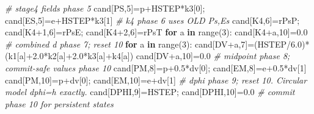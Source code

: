 \documentclass[
  a4paper,
]{article}
\newenvironment{Shaded}{}{}
\newcommand{\BuiltInTok}[1]{\textcolor[rgb]{0.00,0.50,0.00}{#1}}
\newcommand{\CommentTok}[1]{\textcolor[rgb]{0.38,0.63,0.69}{\textit{#1}}}
\newcommand{\ControlFlowTok}[1]{\textcolor[rgb]{0.00,0.44,0.13}{\textbf{#1}}}
\newcommand{\DecValTok}[1]{\textcolor[rgb]{0.25,0.63,0.44}{#1}}
\newcommand{\FloatTok}[1]{\textcolor[rgb]{0.25,0.63,0.44}{#1}}
\newcommand{\KeywordTok}[1]{\textcolor[rgb]{0.00,0.44,0.13}{\textbf{#1}}}
\newcommand{\NormalTok}[1]{#1}
\newcommand{\OperatorTok}[1]{\textcolor[rgb]{0.40,0.40,0.40}{#1}}
\begin{document}
\begin{Shaded}
\begin{Highlighting}[]
    \CommentTok{\# stage4 fields phase 5}
\NormalTok{    cand[PS,}\DecValTok{5}\NormalTok{]}\OperatorTok{=}\NormalTok{p}\OperatorTok{+}\NormalTok{HSTEP}\OperatorTok{*}\NormalTok{k3[}\DecValTok{0}\NormalTok{]}\OperatorTok{;}\NormalTok{ cand[ES,}\DecValTok{5}\NormalTok{]}\OperatorTok{=}\NormalTok{e}\OperatorTok{+}\NormalTok{HSTEP}\OperatorTok{*}\NormalTok{k3[}\DecValTok{1}\NormalTok{]}
    \CommentTok{\# k4 phase 6 uses OLD Ps,Es}
\NormalTok{    cand[K4,}\DecValTok{6}\NormalTok{]}\OperatorTok{=}\NormalTok{rPsP}\OperatorTok{;}\NormalTok{ cand[K4}\OperatorTok{+}\DecValTok{1}\NormalTok{,}\DecValTok{6}\NormalTok{]}\OperatorTok{=}\NormalTok{rPsE}\OperatorTok{;}\NormalTok{ cand[K4}\OperatorTok{+}\DecValTok{2}\NormalTok{,}\DecValTok{6}\NormalTok{]}\OperatorTok{=}\NormalTok{rPsT}
    \ControlFlowTok{for}\NormalTok{ a }\KeywordTok{in} \BuiltInTok{range}\NormalTok{(}\DecValTok{3}\NormalTok{): cand[K4}\OperatorTok{+}\NormalTok{a,}\DecValTok{10}\NormalTok{]}\OperatorTok{=}\FloatTok{0.0}
    \CommentTok{\# combined d phase 7; reset 10}
    \ControlFlowTok{for}\NormalTok{ a }\KeywordTok{in} \BuiltInTok{range}\NormalTok{(}\DecValTok{3}\NormalTok{):}
\NormalTok{        cand[DV}\OperatorTok{+}\NormalTok{a,}\DecValTok{7}\NormalTok{]}\OperatorTok{=}\NormalTok{(HSTEP}\OperatorTok{/}\FloatTok{6.0}\NormalTok{)}\OperatorTok{*}\NormalTok{(k1[a]}\OperatorTok{+}\FloatTok{2.0}\OperatorTok{*}\NormalTok{k2[a]}\OperatorTok{+}\FloatTok{2.0}\OperatorTok{*}\NormalTok{k3[a]}\OperatorTok{+}\NormalTok{k4[a])}
\NormalTok{        cand[DV}\OperatorTok{+}\NormalTok{a,}\DecValTok{10}\NormalTok{]}\OperatorTok{=}\FloatTok{0.0}
    \CommentTok{\# midpoint phase 8; commit{-}safe values phase 10}
\NormalTok{    cand[PM,}\DecValTok{8}\NormalTok{]}\OperatorTok{=}\NormalTok{p}\OperatorTok{+}\FloatTok{0.5}\OperatorTok{*}\NormalTok{dv[}\DecValTok{0}\NormalTok{]}\OperatorTok{;}\NormalTok{ cand[EM,}\DecValTok{8}\NormalTok{]}\OperatorTok{=}\NormalTok{e}\OperatorTok{+}\FloatTok{0.5}\OperatorTok{*}\NormalTok{dv[}\DecValTok{1}\NormalTok{]}
\NormalTok{    cand[PM,}\DecValTok{10}\NormalTok{]}\OperatorTok{=}\NormalTok{p}\OperatorTok{+}\NormalTok{dv[}\DecValTok{0}\NormalTok{]}\OperatorTok{;}\NormalTok{ cand[EM,}\DecValTok{10}\NormalTok{]}\OperatorTok{=}\NormalTok{e}\OperatorTok{+}\NormalTok{dv[}\DecValTok{1}\NormalTok{]}
    \CommentTok{\# dphi phase 9; reset 10. Circular model dphi=h exactly.}
\NormalTok{    cand[DPHI,}\DecValTok{9}\NormalTok{]}\OperatorTok{=}\NormalTok{HSTEP}\OperatorTok{;}\NormalTok{ cand[DPHI,}\DecValTok{10}\NormalTok{]}\OperatorTok{=}\FloatTok{0.0}
    \CommentTok{\# commit phase 10 for persistent states}

\end{Highlighting}
\end{Shaded}
\end{document}
